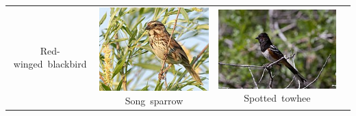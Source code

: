 \documentclass{beamer}
\begin{document}
\begin{frame}
{\begin{tabular}{cccc}
{            \hbox{\tiny Red-winged blackbird}}
        &
        \vbox{%
            \hbox{\includegraphics[width=\picwidth]{images/sonspa.jpg}}
            \hbox{\tiny Song sparrow}}
        & 
        \vbox{%
            \hbox{\includegraphics[width=\picwidth]{images/spotow.jpg}}
            \hbox{\tiny Spotted towhee}}\\
    \end{tabular}}
\end{frame}
\end{document}
